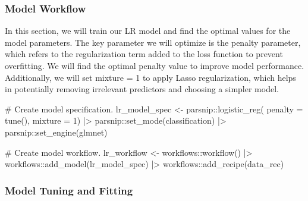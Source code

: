 \documentclass[
  letterpaper,
  DIV=11,
  numbers=noendperiod]{scrartcl}
\newenvironment{Shaded}{\begin{snugshade}}{\end{snugshade}}
\newcommand{\AttributeTok}[1]{\textcolor[rgb]{0.40,0.45,0.13}{#1}}
\newcommand{\CommentTok}[1]{\textcolor[rgb]{0.37,0.37,0.37}{#1}}
\newcommand{\DecValTok}[1]{\textcolor[rgb]{0.68,0.00,0.00}{#1}}
\newcommand{\FunctionTok}[1]{\textcolor[rgb]{0.28,0.35,0.67}{#1}}
\newcommand{\NormalTok}[1]{\textcolor[rgb]{0.00,0.23,0.31}{#1}}
\newcommand{\OtherTok}[1]{\textcolor[rgb]{0.00,0.23,0.31}{#1}}
\newcommand{\SpecialCharTok}[1]{\textcolor[rgb]{0.37,0.37,0.37}{#1}}
\newcommand{\StringTok}[1]{\textcolor[rgb]{0.13,0.47,0.30}{#1}}
\begin{document}
\subsubsection{Model Workflow}\label{model-workflow-3}

In this section, we will train our LR model and find the optimal values
for the model parameters. The key parameter we will optimize is the
penalty parameter, which refers to the regularization term added to the
loss function to prevent overfitting. We will find the optimal penalty
value to improve model performance. Additionally, we will set mixture =
1 to apply Lasso regularization, which helps in potentially removing
irrelevant predictors and choosing a simpler model.

\begin{Shaded}
\begin{Highlighting}[]
\CommentTok{\# Create model specification.}
\NormalTok{lr\_model\_spec }\OtherTok{\textless{}{-}}
\NormalTok{  parsnip}\SpecialCharTok{::}\FunctionTok{logistic\_reg}\NormalTok{(}
    \AttributeTok{penalty =} \FunctionTok{tune}\NormalTok{(),}
    \AttributeTok{mixture =} \DecValTok{1}\NormalTok{) }\SpecialCharTok{|\textgreater{}}
\NormalTok{  parsnip}\SpecialCharTok{::}\FunctionTok{set\_mode}\NormalTok{(}\StringTok{\textquotesingle{}classification\textquotesingle{}}\NormalTok{) }\SpecialCharTok{|\textgreater{}}
\NormalTok{  parsnip}\SpecialCharTok{::}\FunctionTok{set\_engine}\NormalTok{(}\StringTok{\textquotesingle{}glmnet\textquotesingle{}}\NormalTok{)}

\CommentTok{\# Create model workflow.}
\NormalTok{lr\_workflow }\OtherTok{\textless{}{-}}\NormalTok{ workflows}\SpecialCharTok{::}\FunctionTok{workflow}\NormalTok{() }\SpecialCharTok{|\textgreater{}}
\NormalTok{  workflows}\SpecialCharTok{::}\FunctionTok{add\_model}\NormalTok{(lr\_model\_spec) }\SpecialCharTok{|\textgreater{}}
\NormalTok{  workflows}\SpecialCharTok{::}\FunctionTok{add\_recipe}\NormalTok{(data\_rec)}
\end{Highlighting}
\end{Shaded}

\subsubsection{Model Tuning and
Fitting}\label{model-tuning-and-fitting-3}
\end{document}
